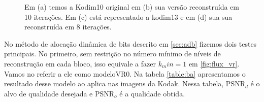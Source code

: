 \begin{figure}
	
	\hfill
	
	\hfill
	\caption{Em (a) temos a Kodim10 original em (b) sua versão reconstruída em 10 iterações. Em (c) está representado a kodim13 e em (d) sua sua reconstruída em 8 iterações.}
	\label{fig:kodim13}
\end{figure}
No método de alocação dinâmica de bits descrito em \ref{sec:adb} fizemos dois testes principais. No primeiro, sem restrição no número mínimo de níveis de reconstrução em cada bloco, isso equivale a fazer $k_min=1$ em \ref{fig:flux_vr}. Vamos no referir a ele como modeloVR0. Na tabela \ref{table:ba} apresentamos o resultado desse modelo ao aplica nas imagens da Kodak. Nessa tabela, PSNR$_d$ é o alvo de qualidade desejada e PSNR$_o$ é a qualidade obtida. 

